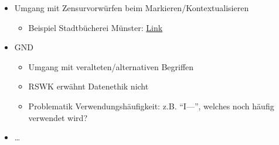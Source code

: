 \documentclass[
  letterpaper,
  DIV=11,
  numbers=noendperiod]{scrartcl}
\providecommand{\tightlist}{%
  \setlength{\itemsep}{0pt}\setlength{\parskip}{0pt}}\usepackage{longtable,booktabs,array}
\begin{document}
\begin{tcolorbox}[enhanced jigsaw, colbacktitle=quarto-callout-tip-color!10!white, rightrule=.15mm, coltitle=black, left=2mm, opacitybacktitle=0.6, toptitle=1mm, title=\textcolor{quarto-callout-tip-color}{\faLightbulb}\hspace{0.5em}{Erfahrungen}, colback=white, colframe=quarto-callout-tip-color-frame, opacityback=0, titlerule=0mm, leftrule=.75mm, breakable, bottomtitle=1mm, bottomrule=.15mm, arc=.35mm, toprule=.15mm]

\begin{itemize}
\tightlist
\item
  Umgang mit Zensurvorwürfen beim Markieren/Kontextualisieren

  \begin{itemize}
  \tightlist
  \item
    Beispiel Stadtbücherei Münster:
    \href{https://www.rtl.de/cms/muenster-warnhinweise-in-stadtbuecherei-sorgen-fuer-diskussionen-5095758.html}{Link}
  \end{itemize}
\item
  GND

  \begin{itemize}
  \tightlist
  \item
    Umgang mit veralteten/alternativen Begriffen
  \item
    RSWK erwähnt Datenethik nicht
  \item
    Problematik Verwendungshäufigkeit: z.B. ``I---'', welches noch
    häufig verwendet wird?
  \end{itemize}
\item
  \ldots{}
\end{itemize}

\end{tcolorbox}
\end{document}
